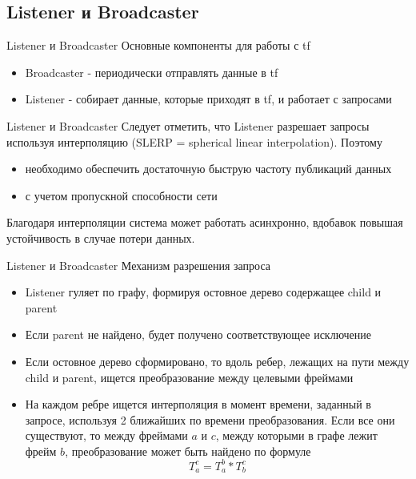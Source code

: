\documentclass[9pt]{beamer}
\begin{document}
\subsection{Listener и Broadcaster}

\begin{frame}{Listener и Broadcaster}
Основные компоненты для работы с tf
\begin{itemize}
    \item
    {
      Broadcaster - периодически отправлять данные в tf
    }
    \item
    {
      Listener - собирает данные, которые приходят в tf, и работает с запросами
    }
  \end{itemize}

\end{frame}

\begin{frame}{Listener и Broadcaster}
Следует отметить, что Listener разрешает запросы используя интерполяцию (SLERP = spherical linear interpolation). Поэтому
\begin{itemize}
    \item
    {
      необходимо обеспечить достаточную быструю частоту публикаций данных
    }
    \item
    {
      с учетом пропускной способности сети
    }
  \end{itemize}

Благодаря интерполяции система может работать асинхронно, вдобавок повышая устойчивость в случае потери данных.

\end{frame}

\begin{frame}{Listener и Broadcaster}
Механизм разрешения запроса
\begin{itemize}
    \item
    {
      Listener гуляет по графу, формируя остовное дерево содержащее child и parent
    }
    \item
    {
      Если parent не найдено, будет получено соответствующее исключение
    }
    \item
    {
      Если остовное дерево сформировано, то вдоль ребер, лежащих на пути между child и parent, ищется преобразование между целевыми фреймами
    }
    \item
    {
      На каждом ребре ищется интерполяция в момент времени, заданный в запросе, используя 2 ближайших по времени преобразования. Если все они существуют, то между фреймами $a$ и $c$, между которыми в графе лежит фрейм $b$, преобразование может быть найдено по формуле
      $$T^c_a = T^b_a \ast T^c_b $$ 
    }
  \end{itemize}
\end{frame}
\end{document}
